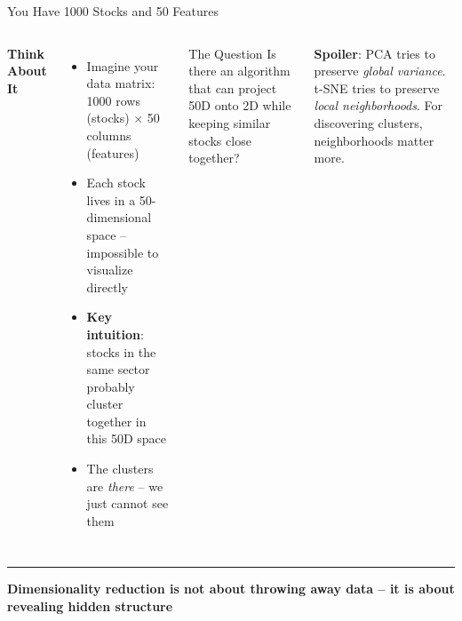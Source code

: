\documentclass[8pt,aspectratio=169]{beamer}
\newcommand{\bottomnote}[1]{%
\vfill
\vspace{-2mm}
\textcolor{mllavender2}{\rule{\textwidth}{0.4pt}}
\vspace{1mm}
\footnotesize
\textbf{#1}
}
\newenvironment{compactlist}{%
  \begin{itemize}%
    \setlength{\itemsep}{2pt}%
    \setlength{\parskip}{0pt}%
    \setlength{\parsep}{0pt}%
}{%
  \end{itemize}%
}
\newcommand{\highlight}[1]{\textcolor{mlorange}{\textbf{#1}}}
\begin{document}
\begin{frame}[t]{You Have 1000 Stocks and 50 Features}
\begin{columns}[T]
\small
\textbf{Think About It}
\begin{compactlist}
\item Imagine your data matrix: 1000 rows (stocks) $\times$ 50 columns (features)
\item Each stock lives in a 50-dimensional space -- impossible to visualize directly
\item \highlight{Key intuition}: stocks in the same sector probably cluster together in this 50D space
\item The clusters are \emph{there} -- we just cannot see them
\end{compactlist}

\vspace{3mm}
\begin{block}{The Question}
\scriptsize Is there an algorithm that can project 50D onto 2D while keeping similar stocks close together?
\end{block}

\vspace{2mm}
\scriptsize \textbf{Spoiler}: PCA tries to preserve \emph{global variance}. t-SNE tries to preserve \emph{local neighborhoods}. For discovering clusters, neighborhoods matter more.
\end{columns}

\bottomnote{Dimensionality reduction is not about throwing away data -- it is about revealing hidden structure}
\end{frame}
\end{document}
